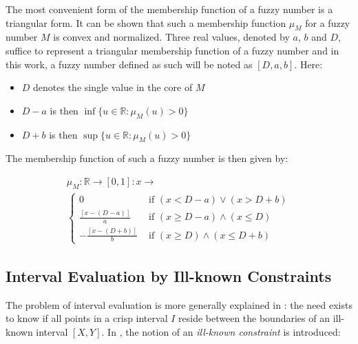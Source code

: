 The most convenient form of the membership function of a fuzzy number is a triangular form. It can be shown that such a membership function $\mu_M$ for a fuzzy number $M$ is convex and normalized. Three real values, denoted by $a$, $b$ and $D$, suffice to represent a triangular membership function of a fuzzy number and in this work, a fuzzy number defined as such will be noted as $\left[D, a, b \right]$. Here:
\begin{itemize}
\item
$D$ denotes the single value in the core of $M$
\item
$D-a$ is then $\inf \{u \in \mathbb{R} : \mu_{M}(u) > 0\}$
\item
$D+b$ is then $\sup \{u \in \mathbb{R} : \mu_{M}(u) > 0\}$
\end{itemize}

The membership function of such a fuzzy number is then given by:

\vspace{-10pt}

\begin{align}
\mu_M :   \mathbb{R} \rightarrow \left[0,1\right] :  x \rightarrow \nonumber\\
\begin{cases}
\nonumber
0 & \mbox{ if } \left(x < D-a\right) \vee \left(x > D+b\right) \\
\frac{\left[x-\left(D-a\right)\right]}{a} & \mbox{ if } \left(x \geq D-a\right) \wedge (x \leq D)  \\
-\frac{\left[x-\left(D+b\right)\right]}{b} & \mbox{ if } \left(x \geq D\right) \wedge (x \leq D+b)
\end{cases}
\end{align}

%  



\subsection{\label{subsec:interval-evaluation-by-ill-known-constraints}Interval Evaluation by Ill-known Constraints}
The problem of interval evaluation is more generally explained in \cite{Pons2011}: the need exists to know if all points in a crisp interval $I$ reside between the boundaries of an ill-known interval $\left[ X , Y \right]$. In \cite{Pons2011}, the notion of an \emph{ill-known constraint} is introduced:

